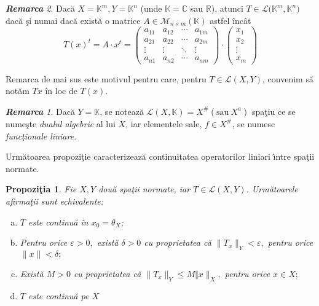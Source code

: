 \documentclass[ a4paper, 12pt]{report}
\newtheorem{prop}[theorem]{\bf Propozi\c tia }
\theoremstyle{definition}
\theoremstyle{remark}
\newtheorem{remarc}{\bf Remarca}[section]
\numberwithin{equation}{section}
\begin{document}
\begin{remarc}
Dac\u a $X = \mathbb{K}^{m}, Y = \mathbb{K}^{n}$ (unde $\mathbb{K} = \mathbb{C}$ sau $\mathbb{R}$), atunci $T \in \mathcal{L}\Big( \mathbb{K}^{m}, \mathbb{K}^{n} \Big)$ dac\u a \c si numai dac\u a exist\u a o matrice $A \in \mathcal{M}_{n \times m}(\mathbb{K})$ astfel \^inc\^at
$$ T(x)^{t} = A \cdot x^{t} = \begin{pmatrix}
  a_{11} & a_{12} & \cdots & a_{1m} \\
  a_{21} & a_{22} & \cdots & a_{2m} \\
  \vdots  & \vdots  & \ddots & \vdots  \\
  a_{n1} & a_{n2} & \cdots & a_{nm}
 \end{pmatrix} \cdot \begin{pmatrix}
 x_1\\
 x_2\\
 \vdots\\
 x_m
 \end{pmatrix}$$

\medskip
Remarca de mai sus este motivul pentru care, pentru $T \in \mathcal{L}(X,Y)$, convenim s\u a not\u am $T{x}$ \^in loc de $T(x)$.
\medskip

\begin{remarc}
Dac\u a $Y = \mathbb{K}$, se noteaz\u a $\mathcal{L}(X,\mathbb{K}) = X^{\#} ( \mbox{sau}\ X^{a})$ spa\c tiu ce se nume\c ste {\it dualul algebric} al lui $X$, iar elementele sale, $f \in X^{\#}$, se  numesc {\it func\c tionale liniare}.
\end{remarc}

Urm\u atoarea propozi\c tie caracterizeaz\u a continuitatea operatorilor liniari \^\i ntre spa\c tii normate.

\begin{prop}
Fie $X, Y$ dou\u a spa\c tii normate,  iar $T \in \mathcal{L}(X,Y)$. Urm\u atoarele afirma\c tii sunt echivalente:
\begin{enumerate}[(a)]
\item $T$ este continu\u a \^in $x_0 = \theta_{X}$;
\item Pentru orice $\varepsilon>0,$ exist\u a $\delta>0$ cu proprietatea c\u a $\lVert T_x \rVert_Y<\varepsilon,$ pentru orice $\lVert x \rVert<\delta;$
\item Exist\u a $M>0$ cu proprietatea c\u a $\lVert T_x \rVert_Y \leq M \Vert x \rVert_X,$ pentru orice $x \in X;$
\item $T$ este continu\u a pe $X$
\end{enumerate}
\end{prop}


\end{remarc}
\end{document}
